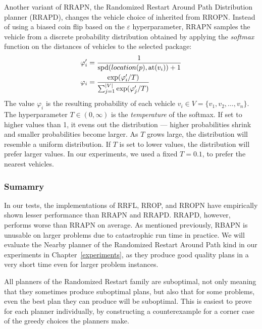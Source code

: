 Another variant of RRAPN, the
Randomized Restart Around Path Distribution planner (RRAPD),
changes the vehicle choice of inherited from RROPN.
Instead of using a biased coin flip based on the $\varepsilon$
hyperparameter, RRAPN samples the vehicle
from a discrete probability distribution
obtained by applying the \textit{softmax} function on the distances of vehicles to the selected package:
\begin{align*}
\varphi'_i &= \frac{1}{\textrm{spd}(location(p), \textrm{at}(v_i)) + 1}\\
\varphi_i &= \frac{\exp(\varphi'_i/T)}{\sum_{j = 1}^{|V|} \exp(\varphi'_j/T)}
\end{align*}
The value $\varphi_i$ is the resulting probability of each vehicle $v_i \in V = \{v_1, v_2, \ldots, v_n\}$.
The hyperparameter $T \in (0, \infty)$ is the \textit{temperature}
of the softmax. If set to higher values than 1, it
evens out the distribution --- higher probabilities shrink
and smaller probabilities become larger.
As $T$ grows large, the distribution will resemble a uniform distribution.
If $T$ is set to lower values, the distribution will prefer larger values.
In our experiments, we used a fixed $T = 0.1$, to prefer the nearest vehicles.

\subsubsection{Sumamry}

In our tests, the implementations
of RRFL, RROP, and RROPN have empirically shown
lesser performance than RRAPN and RRAPD.
RRAPD, however, performs worse than RRAPN on
average.
As mentioned previously, RBAPN is unusable on larger
problems due to catastrophic run time in practice.
We will evaluate the Nearby planner
of the Randomized Restart Around Path
kind in our experiments in Chapter~\ref{experiments},
as they produce good quality plans in a very short time
even for larger problem instances.

All planners of the Randomized Restart family
are suboptimal, not only meaning that they sometimes produce
suboptimal plans, but also that for some problems,
even the best plan they can produce will be suboptimal.
This is easiest to prove for each planner individually,
by constructing a counterexample for a corner
case of the 
greedy
choices
the planners make.



























